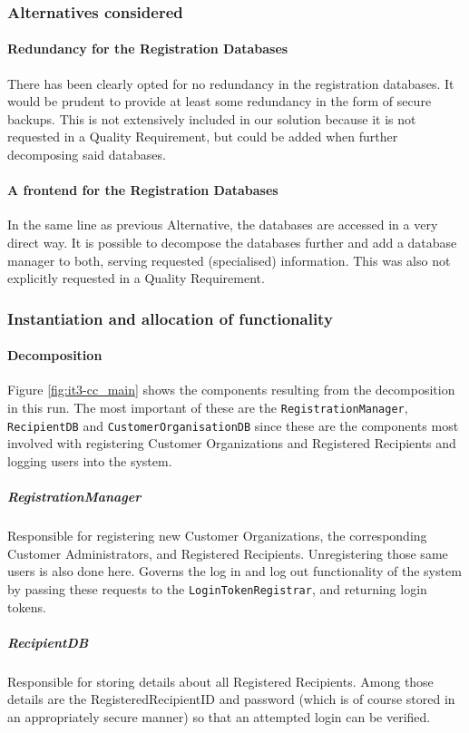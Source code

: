 \documentclass[a4paper,10pt]{article}
\begin{document}
\subsubsection*{Alternatives considered}
\paragraph{Redundancy for the Registration Databases}
There has been clearly opted for no redundancy in the registration databases. It would be prudent to provide at least some redundancy in the form of secure backups. This is not extensively included in our solution because it is not requested in a Quality Requirement, but could be added when further decomposing said databases.

\paragraph{A frontend for the Registration Databases}
In the same line as previous Alternative, the databases are accessed in a very direct way. It is possible to decompose the databases further and add a database manager to both, serving requested (specialised) information. This was also not explicitly requested in a Quality Requirement.

\subsubsection{Instantiation and allocation of functionality}
\paragraph{Decomposition}
Figure \ref{fig:it3-cc_main} shows the components resulting from the decomposition in this run. The most important of these are the \texttt{RegistrationManager}, \texttt{RecipientDB} and \texttt{CustomerOrganisationDB} since these are the components most involved with registering Customer Organizations and Registered Recipients and logging users into the system.

\subparagraph{RegistrationManager}
Responsible for registering new Customer Organizations, the corresponding Customer Administrators, and Registered Recipients. Unregistering those same users is also done here. Governs the log in and log out functionality of the system by passing these requests to the \texttt{LoginTokenRegistrar}, and returning login tokens.

\subparagraph{RecipientDB}
Responsible for storing details about all Registered Recipients. Among those details are the RegisteredRecipientID and password (which is of course stored in an appropriately secure manner) so that an attempted login can be verified.
\end{document}
